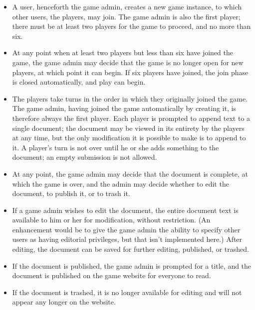 \documentclass{manual}
\begin{document}
\begin{itemize}

\item A user, henceforth the game admin, creates a new game instance,
to which other users, the players, may join.  The game admin is also
the first player; there must be at least two players for the game to
proceed, and no more than six.  

\item At any point when at least two players but less than six have
joined the game, the game admin may decide that the game is no longer
open for new players, at which point it can begin.  If six players
have joined, the join phase is closed automatically, and play can
begin.

\item The players take turns in the order in which they originally
joined the game.  The game admin, having joined the game automatically
by creating it, is therefore always the first player.  Each player is
prompted to append text to a single document; the document may be
viewed in its entirety by the players at any time, but the only
modification it is possible to make is to append to it.  A player's
turn is not over until he or she adds something to the document; an
empty submission is not allowed.

\item At any point, the game admin may decide that the document is
complete, at which the game is over, and the admin may decide whether
to edit the document, to publish it, or to trash it.  

\item If a game admin wishes to edit the document, the entire document
text is available to him or her for modification, without restriction.
(An enhancement would be to give the game admin the ability to specify
other users as having editorial privileges, but that isn't implemented
here.)  After editing, the document can be saved for further editing,
published, or trashed.

\item If the document is published, the game admin is prompted for a
title, and the document is published on the game website for everyone
to read.

\item If the document is trashed, it is no longer available for
editing and will not appear any longer on the website.

\end{itemize}
\end{document}
